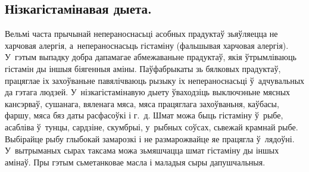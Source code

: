 \subsection{Нізкагістамінавая дыета.}
Вельмі часта прычынай непераноснасьці асобных прадуктаў зьяўляецца не харчовая алергія, а~непераноснасьць гістаміну (фальшывая харчовая алергія). У~гэтым выпадку добра дапамагае абмежаваньне прадуктаў, якія ўтрымліваюць гістамін ды іншыя біягенныя аміны. Паўфабрыкаты зь бялковых прадуктаў, працяглае іх захоўваньне павялічваюць рызыку іх непераноснасьці ў~адчувальных да гэтага людзей. У~нізкагістамінавую дыету ўваходзіць выключэньне мясных кансэрваў, сушанага, вяленага мяса, мяса працяглага захоўваньня, каўбасы, фаршу, мяса бяз даты расфасоўкі і г.~д. Шмат можа быць гістаміну ў~рыбе, асабліва ў~тунцы, сардзіне, скумбрыі, у~рыбных соўсах, сьвежай крамнай рыбе. Выбірайце рыбу глыбокай замарозкі і не размарожвайце яе працягла ў~лядоўні. У~вытрыманых сырах таксама можа зьмяшчацца шмат гістаміну ды іншых амінаў. Пры гэтым сьметанковае масла і маладыя сыры дапушчальныя.
